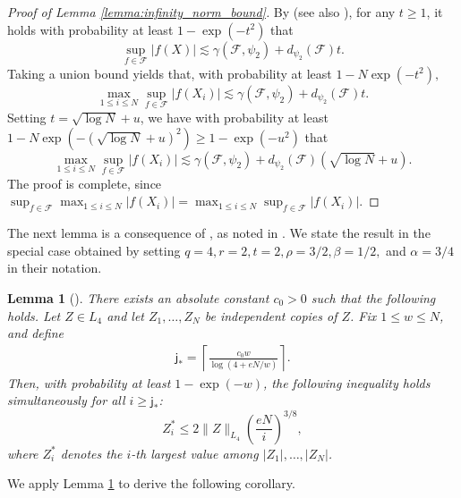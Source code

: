 \documentclass[numbers,webpdf,imaiai]{ima-authoring-template}
\theoremstyle{thmstyletwo}%
\newtheorem{lemma}[theorem]{Lemma}
\numberwithin{equation}{section}
\numberwithin{equation}{section}
\providecommand{\mathbbm}{\mathbb} %
\newcommand{\R}{\mathbbm{R}}
\newcommand{\F}{\mathcal{F}}
\begin{document}
\begin{proof}[Proof of Lemma \ref{lemma:infinity_norm_bound}]
    By \cite[Theorem 3.2]{dirksen2015tail} (see also \cite[Theorem 4.5]{al2025sharp}), for any $t\ge 1$, it holds with probability at least $1-\exp(-t^2)$ that
    \[
    \sup_{f\in \F} |f(X)|\lesssim \gamma(\F,\psi_2)+d_{\psi_2}(\F)t.
    \]
   Taking a union bound yields that, with probability at least $1-N\exp(-t^2),$
    \[
    \max_{1\le i\le N} \sup_{f\in \F} |f(X_i)|\lesssim \gamma(\F,\psi_2)+d_{\psi_2}(\F)t.
    \]
    Setting $t=\sqrt{\log N}+u$, we have with probability at least $1-N\exp(-(\sqrt{\log N}+u)^2)\ge 1-\exp(-u^2)$ that
    \[
    \max_{1\le i\le N} \sup_{f\in \F} |f(X_i)|\lesssim \gamma(\F,\psi_2)+d_{\psi_2}(\F)(\sqrt{\log N}+u).
    \]
    The proof is complete, since $\sup_{f\in \F} \max_{1\le i\le N} |f(X_i)|=\max_{1\le i\le N} \sup_{f\in \F}|f(X_i)|$.
\end{proof}





The next lemma is a consequence of \cite[Lemma 3.2]{mendelson2016upper}, as noted in \cite[Remark 3.3]{mendelson2016upper}. We state the result in the special case obtained by setting $q=4, r=2, t=2, \rho=3/2, \beta=1/2,$ and $\alpha=3/4$ in their notation. 


\begin{lemma}[{\cite[Lemma 3.2, Remark 3.3]{mendelson2016upper}}]\label{lemma:order_stats}
There exists an absolute constant $c_0>0$ such that the following holds. Let $Z\in L_{4}$ and let $Z_1,\ldots, Z_N$ be independent copies of $Z$. Fix $1\le w\le N$, and define
\begin{align}\label{eq:j_0}
\mathsf{j_{*}}=\left\lceil  \frac{c_0 w}{\log (4+eN/w)} \right\rceil.
\end{align}
Then, with probability at least $1-\exp(-w)$, the following inequality holds simultaneously for all $i\ge \mathsf{j_{*}}$:
\[
Z_i^*\le 2\|Z\|_{L_4} \left(\frac{eN}{i}\right)^{3/8},
\]
where $Z_i^*$ denotes the $i$-th largest value among $|Z_1|,\ldots, |Z_{N}|$.
\end{lemma}

We apply Lemma \ref{lemma:order_stats} to derive the following corollary.
\end{document}
